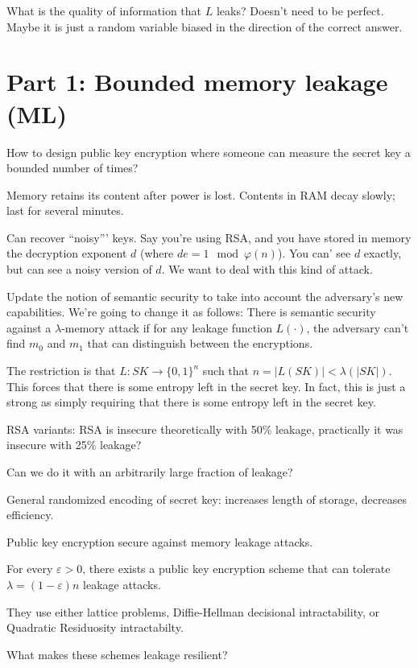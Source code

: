 \documentclass[10pt]{article}
\newcommand{\bit}{\{0,1\}}
\begin{document}
What is the quality of information that $L$ leaks? Doesn't need to be perfect. Maybe it is just a random variable biased in the direction of the correct answer.

\section{Part 1: Bounded memory leakage (ML)}

How to design public key encryption where someone can measure the secret key a bounded number of times?

Memory retains its content after power is lost. Contents in RAM decay slowly; last for several minutes.

Can recover ``noisy''' keys. Say you're using RSA, and you have stored in memory the decryption exponent $d$ (where $d e = 1 \mod \varphi(n)$). You can' see $d$ exactly, but can see a noisy version of $d$. We want to deal with this kind of attack.

Update the notion of semantic security to take into account the adversary's new capabilities. We're going to change it as follows: There is semantic security against a $\lambda$-memory attack if for any leakage function $L(\cdot)$, the adversary can't find $m_0$ and $m_1$ that can distinguish between the encryptions.

The restriction is that $L : SK \to \bit^n$ such that $n = |L(SK)| < \lambda(|SK|)$. This forces that there is some entropy left in the secret key. In fact, this is just a strong as simply requiring that there is some entropy left in the secret key.

RSA variants: RSA is insecure theoretically with 50\% leakage, practically it was insecure with 25\% leakage?

Can we do it with an arbitrarily large fraction of leakage?

General randomized encoding of secret key: increases length of storage, decreases efficiency.

Public key encryption secure against memory leakage attacks.

\begin{theorem}
For every $\varepsilon > 0$, there exists a public key encryption scheme that can tolerate $\lambda = (1 - \varepsilon)n$ leakage attacks.
\end{theorem}
They use either lattice problems, Diffie-Hellman decisional intractability, or Quadratic Residuosity intractabilty.

What makes these schemes leakage resilient?
\end{document}
